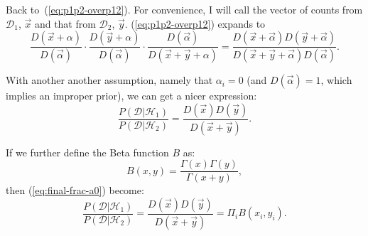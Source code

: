 \documentclass{article}
\let\product\Pi
\begin{document}
Back to~(\ref{eq:p1p2-overp12}). For convenience, I will call the vector of
counts from $\mathcal{D}_1$, $\vec{x}$ and that from $\mathcal{D}_2$, $\vec{y}$.
(\ref{eq:p1p2-overp12}) expands to
\begin{equation}
\frac{D(\vec{x}+\alpha)}{D(\vec{\alpha})}\cdot
    \frac{D(\vec{y}+\alpha)}{D(\vec{\alpha})}\cdot
    \frac{D(\vec{\alpha})}{D(\vec{x}+\vec{y}+\alpha)} =
\frac{D(\vec{x}+\vec{\alpha})D(\vec{y}+\vec\alpha)}{D(\vec{x}+\vec{y}+\vec\alpha) D(\vec\alpha)}.
\end{equation}

With another another assumption, namely that $\alpha_i = 0$ (and $D(\vec\alpha)
= 1$, which implies an improper prior), we can get a nicer expression:
\begin{equation}
\frac{P(\mathcal{D}|\mathcal{H}_1)}{P(\mathcal{D}|\mathcal{H}_2)} = \frac{D(\vec{x})D(\vec{y})}{D(\vec{x}+\vec{y})}.
\label{eq:final-frac-a0}
\end{equation}

If we further define the Beta function $B$ as:
\begin{equation}
B(x,y) = \frac{\Gamma(x)\Gamma(y)}{\Gamma(x+y)},
\end{equation}
then (\ref{eq:final-frac-a0}) become:
\begin{equation}
\frac{P(\mathcal{D}|\mathcal{H}_1)}{P(\mathcal{D}|\mathcal{H}_2)} =
        \frac{D(\vec{x})D(\vec{y})}{D(\vec{x}+\vec{y})} =
        \product_i B(x_i, y_i).
\end{equation}
\end{document}
